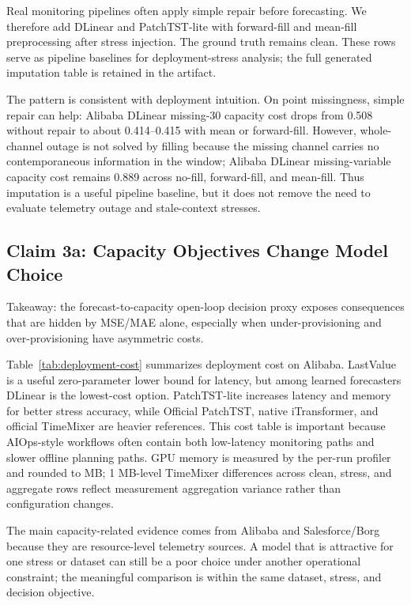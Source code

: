 \documentclass[conference]{IEEEtran}
\begin{document}
Real monitoring pipelines often apply simple repair before forecasting. We therefore add DLinear and PatchTST-lite with forward-fill and mean-fill preprocessing after stress injection. The ground truth remains clean. These rows serve as pipeline baselines for deployment-stress analysis; the full generated imputation table is retained in the artifact.

The pattern is consistent with deployment intuition. On point missingness, simple repair can help: Alibaba DLinear missing-30 capacity cost drops from 0.508 without repair to about 0.414--0.415 with mean or forward-fill. However, whole-channel outage is not solved by filling because the missing channel carries no contemporaneous information in the window; Alibaba DLinear missing-variable capacity cost remains 0.889 across no-fill, forward-fill, and mean-fill. Thus imputation is a useful pipeline baseline, but it does not remove the need to evaluate telemetry outage and stale-context stresses.

\subsection{Claim 3a: Capacity Objectives Change Model Choice}

Takeaway: the forecast-to-capacity open-loop decision proxy exposes consequences that are hidden by MSE/MAE alone, especially when under-provisioning and over-provisioning have asymmetric costs.

Table~\ref{tab:deployment-cost} summarizes deployment cost on Alibaba. LastValue is a useful zero-parameter lower bound for latency, but among learned forecasters DLinear is the lowest-cost option. PatchTST-lite increases latency and memory for better stress accuracy, while Official PatchTST, native iTransformer, and official TimeMixer are heavier references. This cost table is important because AIOps-style workflows often contain both low-latency monitoring paths and slower offline planning paths.
GPU memory is measured by the per-run profiler and rounded to MB; 1 MB-level TimeMixer differences across clean, stress, and aggregate rows reflect measurement aggregation variance rather than configuration changes.



The main capacity-related evidence comes from Alibaba and Salesforce/Borg because they are resource-level telemetry sources. A model that is attractive for one stress or dataset can still be a poor choice under another operational constraint; the meaningful comparison is within the same dataset, stress, and decision objective.
\end{document}

